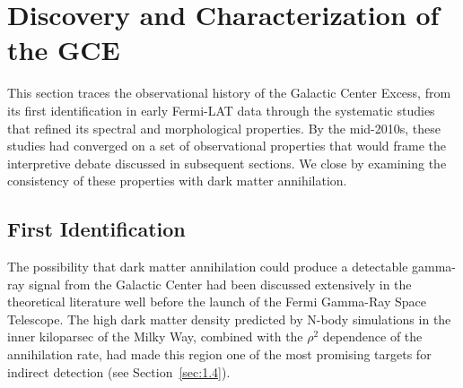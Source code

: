 
\section{Discovery and Characterization of the GCE}
\label{sec:4.1}

This section traces the observational history of the Galactic Center Excess, from its first identification in early Fermi-LAT data through the systematic studies that refined its spectral and morphological properties.
By the mid-2010s, these studies had converged on a set of observational properties that would frame the interpretive debate discussed in subsequent sections.
We close by examining the consistency of these properties with dark matter annihilation.


\subsection{First Identification}
\label{sec:4.1.1}

The possibility that dark matter annihilation could produce a detectable gamma-ray signal from the Galactic Center had been discussed extensively in the theoretical literature well before the launch of the Fermi Gamma-Ray Space Telescope.
The high dark matter density predicted by N-body simulations in the inner kiloparsec of the Milky Way, combined with the $\rho^2$ dependence of the annihilation rate, had made this region one of the most promising targets for indirect detection (see Section~\ref{sec:1.4}).

